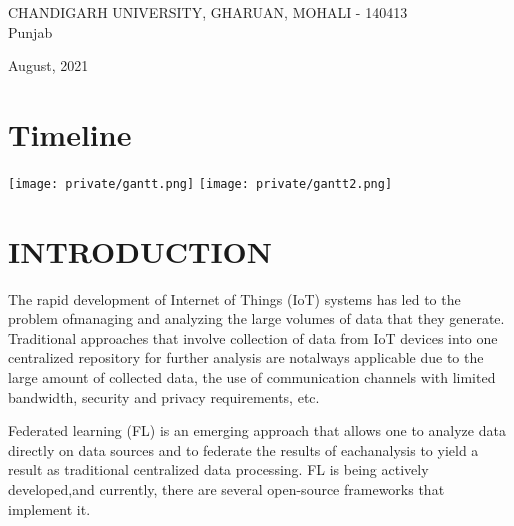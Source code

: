 \documentclass[14pt]{extarticle}
\newcommand\mainmatter{
    \cleardoublepage
    \pagenumbering{arabic}
}
\begin{document}
\begin{center}
\singlespacing

CHANDIGARH UNIVERSITY, GHARUAN, MOHALI - 140413\\
Punjab

\onehalfspacing
August, 2021

\end{center}
\restoregeometry

\newpage

\newpage
{}

\section*{Timeline}
\begin{center}
    \texttt{[image: private/gantt.png]}
    \texttt{[image: private/gantt2.png]}
\end{center}


\newpage
{}
\listoffigures

\newpage
{}
\listoftables

\setlength{\parskip}{0em}
\newpage
{}
\begin{center}
    \tableofcontents
\end{center}

\mainmatter

\setlength{\parskip}{1em}

\newpage
\section{INTRODUCTION}

\par The rapid development of Internet of Things (IoT) systems has led to the problem ofmanaging and analyzing the large volumes of data that they generate. Traditional approaches that involve collection of data from IoT devices into one centralized repository for further analysis are notalways applicable due to the large amount of collected data, the use of communication channels with limited bandwidth, security and privacy requirements, etc.

\par Federated learning (FL) is an emerging approach that allows one to analyze data directly on data sources and to federate the results of eachanalysis to yield a result as traditional centralized data processing. FL is being actively developed,and currently, there are several open-source frameworks that implement it.
\end{document}

